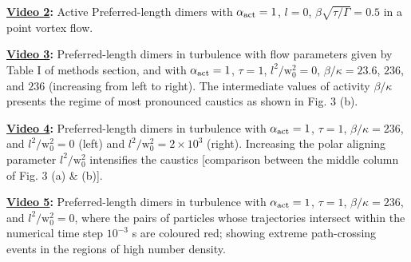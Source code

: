 \documentclass[../Rajarshi-thesis-draft.tex]{subfiles}
\begin{document}
\textbf{\href{https://office365stanford-my.sharepoint.com/:v:/g/personal/rchajwa_stanford_edu/EXS4TQknhbJIkFp9oUu78FUBwCOYzjiOakzS09ai0bqH8Q?nav=eyJyZWZlcnJhbEluZm8iOnsicmVmZXJyYWxBcHAiOiJPbmVEcml2ZUZvckJ1c2luZXNzIiwicmVmZXJyYWxBcHBQbGF0Zm9ybSI6IldlYiIsInJlZmVycmFsTW9kZSI6InZpZXciLCJyZWZlcnJhbFZpZXciOiJNeUZpbGVzTGlua0NvcHkifX0&e=VLAmFk}{Video 2}:} Active Preferred-length dimers with $\alpha_{\rm act} =1$, $l = 0$, $\beta \sqrt{\tau/\Gamma} = 0.5$ in a point vortex flow.

\textbf{\href{https://office365stanford-my.sharepoint.com/:v:/g/personal/rchajwa_stanford_edu/EVu_8SMbr4xCo9drLsQOrsABtEuOLzmdwRygR-g2_Q2tXw?nav=eyJyZWZlcnJhbEluZm8iOnsicmVmZXJyYWxBcHAiOiJPbmVEcml2ZUZvckJ1c2luZXNzIiwicmVmZXJyYWxBcHBQbGF0Zm9ybSI6IldlYiIsInJlZmVycmFsTW9kZSI6InZpZXciLCJyZWZlcnJhbFZpZXciOiJNeUZpbGVzTGlua0NvcHkifX0&e=baRa3i}{Video 3}:} Preferred-length dimers in turbulence with flow parameters given by Table I of methods section, and with $\alpha_{\rm act} = 1$, $\tau = 1$,  $l^{2}/\mathrm{w}_{0}^{2} = 0$, $\beta/\kappa = 23.6$, $236$, and $236$ (increasing from left to right). The intermediate values of activity $\beta/\kappa$ presents the regime of most pronounced caustics as shown in Fig. 3 (b). 

\textbf{\href{https://office365stanford-my.sharepoint.com/:v:/g/personal/rchajwa_stanford_edu/EaiP5FhbPSlOoHMglHp1PMIBi9SDx6OliWZAHdjwiJgWdQ?nav=eyJyZWZlcnJhbEluZm8iOnsicmVmZXJyYWxBcHAiOiJPbmVEcml2ZUZvckJ1c2luZXNzIiwicmVmZXJyYWxBcHBQbGF0Zm9ybSI6IldlYiIsInJlZmVycmFsTW9kZSI6InZpZXciLCJyZWZlcnJhbFZpZXciOiJNeUZpbGVzTGlua0NvcHkifX0&e=VrTY5c}{Video 4}:} Preferred-length dimers in turbulence with $\alpha_{\rm act} = 1$, $\tau = 1$, $\beta/\kappa = 236$, and $l^{2}/\mathrm{w}_{0}^{2} = 0$ (left) and  $l^{2}/\mathrm{w}_{0}^{2} = 2 \times 10^{3}$ (right). Increasing the polar aligning parameter $l^{2}/\mathrm{w}_{0}^{2}$ intensifies the caustics [comparison between the middle column of Fig. 3 (a) \& (b)].

\textbf{\href{https://office365stanford-my.sharepoint.com/:v:/g/personal/rchajwa_stanford_edu/EYqxhl8LVJ5IojTW52UmihEBzxrnWmp4RkYoSyI0AeOnPw?nav=eyJyZWZlcnJhbEluZm8iOnsicmVmZXJyYWxBcHAiOiJPbmVEcml2ZUZvckJ1c2luZXNzIiwicmVmZXJyYWxBcHBQbGF0Zm9ybSI6IldlYiIsInJlZmVycmFsTW9kZSI6InZpZXciLCJyZWZlcnJhbFZpZXciOiJNeUZpbGVzTGlua0NvcHkifX0&e=6cctRD}{Video 5}:} Preferred-length dimers in turbulence with $\alpha_{\rm act} = 1$, $\tau = 1$, $\beta/\kappa = 236$, and $l^{2}/\mathrm{w}_{0}^{2} = 0$, where the pairs of particles whose trajectories intersect within the numerical time step $10^{-3}$ s are coloured red; showing extreme path-crossing events in the regions of high number density.
\end{document}
